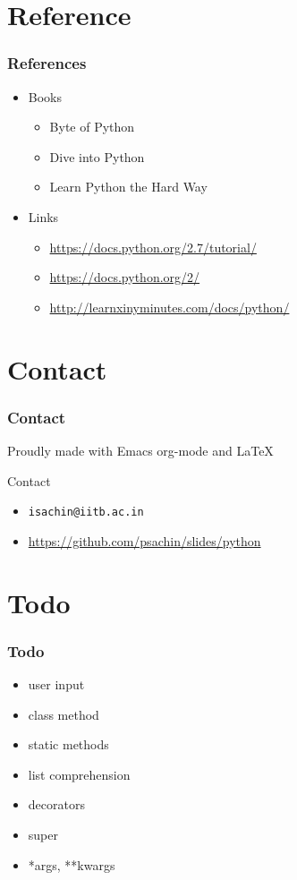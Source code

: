 \documentclass[bigger, presentation]{beamer}
\begin{document}
\section{Reference}
\label{sec-5}
\begin{frame}
\frametitle{References}
\label{sec-5-1}

\begin{itemize}
\item Books
\begin{itemize}
\item Byte of Python
\item Dive into Python
\item Learn Python the Hard Way
\end{itemize}
\item Links
\begin{itemize}
\item \href{https://docs.python.org/2.7/tutorial/}{https://docs.python.org/2.7/tutorial/}
\item \href{https://docs.python.org/2/}{https://docs.python.org/2/}
\item \href{http://learnxinyminutes.com/docs/python/}{http://learnxinyminutes.com/docs/python/}
\end{itemize}
\end{itemize}
\end{frame}
\section{Contact}
\label{sec-6}
\begin{frame}
\frametitle{Contact}
\label{sec-6-1}

   Proudly made with Emacs org-mode and \LaTeX{}
\begin{block}{Contact}
\label{sec-6-1-1}

\begin{itemize}
\item \texttt{isachin@iitb.ac.in}
\item \href{https://github.com/psachin/slides/python}{https://github.com/psachin/slides/python}
\end{itemize}
\end{block}
\end{frame}
\section{Todo}
\label{sec-7}
\begin{frame}
\frametitle{Todo}
\label{sec-7-1}

\begin{itemize}
\item user input
\item class method
\item static methods
\item list comprehension
\item decorators
\item super
\item *args, **kwargs
\end{itemize}
\end{frame}
\end{document}
